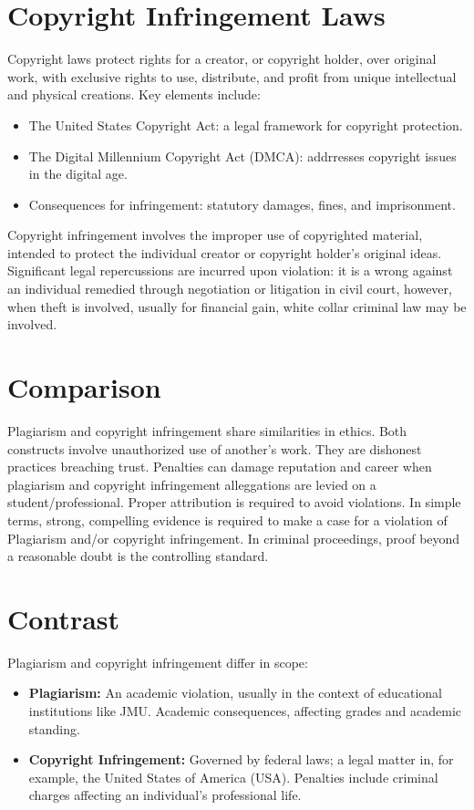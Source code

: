 \documentclass[12pt]{article}
\begin{document}
\section{Copyright Infringement Laws}
Copyright laws protect rights for a creator, or copyright holder, over original work, with exclusive rights to use, distribute, and profit from unique intellectual and physical creations. Key elements include:
\begin{itemize}
    \item The United States Copyright Act: a legal framework for copyright protection.
    \item The Digital Millennium Copyright Act (DMCA): addrresses copyright issues in the digital age.
    \item Consequences for infringement: statutory damages, fines, and imprisonment.
\end{itemize}
Copyright infringement involves the improper use of copyrighted material, intended to protect the individual creator or copyright holder's original ideas.  Significant legal repercussions are incurred upon violation: it is a wrong against an individual remedied through negotiation or litigation in civil court, however, when theft is involved, usually for financial gain, white collar criminal law may be involved.
 
\section{Comparison}
Plagiarism and copyright infringement share similarities in ethics. Both constructs involve unauthorized use of another's work. They are dishonest practices breaching trust. Penalties can damage reputation and career when plagiarism and copyright infringement alleggations are levied on a student/professional. Proper attribution is required to avoid violations.  In simple terms, strong, compelling evidence is required to make a case for a violation of Plagiarism and/or copyright infringement. In criminal proceedings, proof beyond a reasonable doubt is the controlling standard.
 
\section{Contrast}
Plagiarism and copyright infringement differ in scope:
\begin{itemize}
    \item \textbf{Plagiarism:} An academic violation, usually in the context of educational institutions like JMU. Academic consequences, affecting grades and academic standing.
    \item \textbf{Copyright Infringement:} Governed by federal laws; a legal matter in, for example, the United States of America (USA). Penalties include criminal charges affecting an individual's professional life.
\end{itemize}
 
\end{document}
